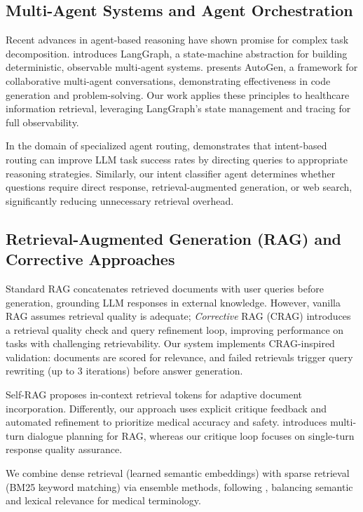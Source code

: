 \documentclass[11pt,a4paper]{article}
\begin{document}
\subsection{Multi-Agent Systems and Agent Orchestration}

Recent advances in agent-based reasoning have shown promise for complex task decomposition. \cite{langraph2024} introduces LangGraph, a state-machine abstraction for building deterministic, observable multi-agent systems. \cite{autogen2023} presents AutoGen, a framework for collaborative multi-agent conversations, demonstrating effectiveness in code generation and problem-solving. Our work applies these principles to healthcare information retrieval, leveraging LangGraph's state management and tracing for full observability.

In the domain of specialized agent routing, \cite{routellm2024} demonstrates that intent-based routing can improve LLM task success rates by directing queries to appropriate reasoning strategies. Similarly, our intent classifier agent determines whether questions require direct response, retrieval-augmented generation, or web search, significantly reducing unnecessary retrieval overhead.

\subsection{Retrieval-Augmented Generation (RAG) and Corrective Approaches}

Standard RAG \cite{lewis2020rag} concatenates retrieved documents with user queries before generation, grounding LLM responses in external knowledge. However, vanilla RAG assumes retrieval quality is adequate; \textit{Corrective} RAG (CRAG) \cite{shi2023crag} introduces a retrieval quality check and query refinement loop, improving performance on tasks with challenging retrievability. Our system implements CRAG-inspired validation: documents are scored for relevance, and failed retrievals trigger query rewriting (up to 3 iterations) before answer generation.

Self-RAG \cite{asai2023self} proposes in-context retrieval tokens for adaptive document incorporation. Differently, our approach uses explicit critique feedback and automated refinement to prioritize medical accuracy and safety. \cite{dopt2024} introduces multi-turn dialogue planning for RAG, whereas our critique loop focuses on single-turn response quality assurance.

We combine dense retrieval (learned semantic embeddings) with sparse retrieval (BM25 keyword matching) via ensemble methods, following \cite{hsieh2023ensemble}, balancing semantic and lexical relevance for medical terminology.
\end{document}

